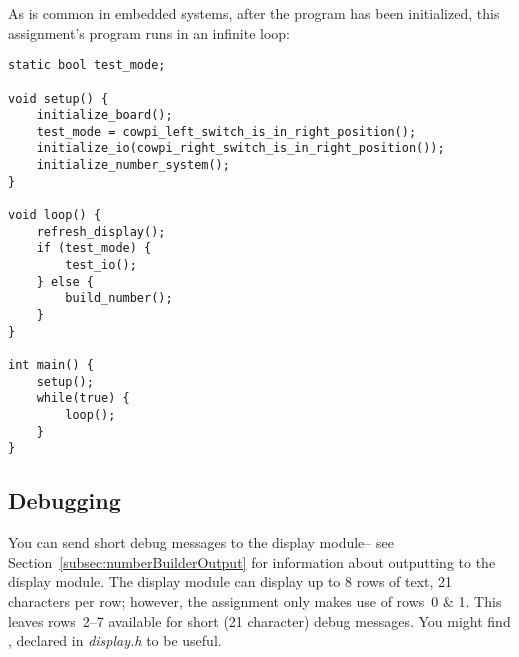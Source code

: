 As is common in embedded systems, after the program has been initialized, this assignment's program runs in an infinite loop:

\begin{lstlisting}[numbers=none, basicstyle=\ttfamily\small]
static bool test_mode;

void setup() {
    initialize_board();
    test_mode = cowpi_left_switch_is_in_right_position();
    initialize_io(cowpi_right_switch_is_in_right_position());
    initialize_number_system();
}

void loop() {
    refresh_display();
    if (test_mode) {
        test_io();
    } else {
        build_number();
    }
}

int main() {
    setup();
    while(true) {
        loop();
    }
}
\end{lstlisting}


\subsection{Debugging} \label{subsec:debugging}

%
%
%

You can send short debug messages to the display module-- see Section~\ref{subsec:numberBuilderOutput} for information about outputting to the display module.
The display module can display up to 8 rows of text, 21 characters per row;
however, the assignment only makes use of rows~0 \& 1.
This leaves rows~2--7 available for short (21 character) debug messages.
You might find , declared in \textit{display.h} to be useful.